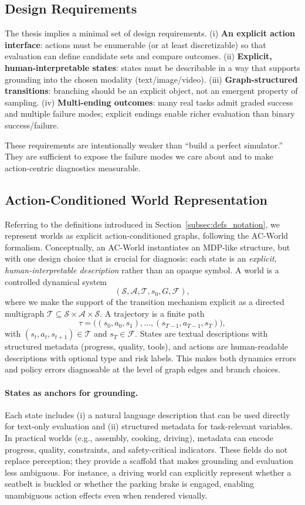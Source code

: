 \documentclass{article}
\theoremstyle{plain}
\theoremstyle{definition}
\theoremstyle{remark}
\begin{document}
\subsection{Design Requirements}
The thesis implies a minimal set of design requirements. (i) \textbf{An explicit action interface}: actions must be enumerable (or at least discretizable) so that evaluation can define candidate sets and compare outcomes. (ii) \textbf{Explicit, human-interpretable states}: states must be describable in a way that supports grounding into the chosen modality (text/image/video). (iii) \textbf{Graph-structured transitions}: branching should be an explicit object, not an emergent property of sampling. (iv) \textbf{Multi-ending outcomes}: many real tasks admit graded success and multiple failure modes; explicit endings enable richer evaluation than binary success/failure.

These requirements are intentionally weaker than ``build a perfect simulator.'' They are sufficient to expose the failure modes we care about and to make action-centric diagnostics measurable.

\subsection{Action-Conditioned World Representation}
Referring to the definitions introduced in Section~\ref{subsec:defs_notation}, we represent worlds as explicit action-conditioned graphs, following the AC-World formalism. Conceptually, an AC-World instantiates an MDP-like structure, but with one design choice that is crucial for diagnosis: each state is an \emph{explicit, human-interpretable description} rather than an opaque symbol. A world is a controlled dynamical system
\[
(\mathcal{S}, \mathcal{A}, \mathcal{T}, s_0, G, \mathcal{F}),
\]
where we make the support of the transition mechanism explicit as a directed multigraph $\mathcal{T} \subseteq \mathcal{S} \times \mathcal{A} \times \mathcal{S}$. A trajectory is a finite path
\[
\tau = \big((s_0,a_0,s_1), \dots, (s_{T-1},a_{T-1},s_T)\big),
\]
with $(s_t,a_t,s_{t+1}) \in \mathcal{T}$ and $s_T \in \mathcal{F}$. States are textual descriptions with structured metadata (progress, quality, tools), and actions are human-readable descriptions with optional type and risk labels. This makes both dynamics errors and policy errors diagnosable at the level of graph edges and branch choices.

\paragraph{States as anchors for grounding.}
Each state includes (i) a natural language description that can be used directly for text-only evaluation and (ii) structured metadata for task-relevant variables. In practical worlds (e.g., assembly, cooking, driving), metadata can encode progress, quality, constraints, and safety-critical indicators. These fields do not replace perception; they provide a scaffold that makes grounding and evaluation less ambiguous. For instance, a driving world can explicitly represent whether a seatbelt is buckled or whether the parking brake is engaged, enabling unambiguous action effects even when rendered visually.
\end{document}
